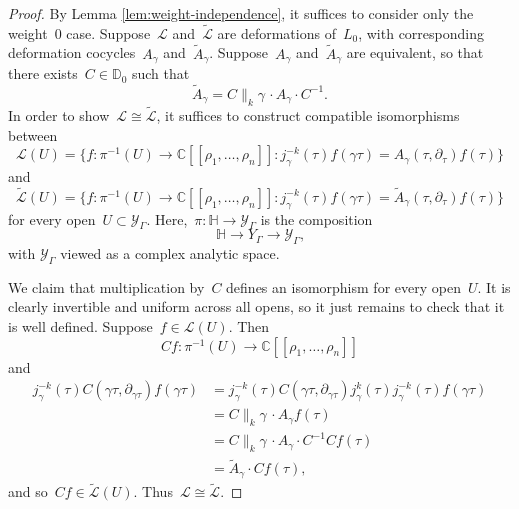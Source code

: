 \documentclass[10pt,a4paper]{article}
\numberwithin{equation}{section}
\theoremstyle{plain}
\theoremstyle{definition}
\newcommand{\tx}{\text}
\newcommand{\bbC}{\ensuremath{\mathbb{C}}}
\newcommand{\bbD}{\ensuremath{\mathbb{D}}}
\newcommand{\cL}{\ensuremath{\mathcal{L}}}
\newcommand{\cY}{\ensuremath{\mathcal{Y}}}
\let\wtd\widetilde
\newcommand{\defcol}{\mathrel{:}}
\newcommand{\condcol}{\mathrel{:}}
\newcommand{\llbrkt}{[\![}
\newcommand{\rrbrkt}{]\!]}
\newcommand{\HS}{\ensuremath{\mathbb{H}}}
\let\Ga\Gamma
\let\ga\gamma
\begin{document}
\begin{proof}
By Lemma \ref{lem:weight-independence}, it suffices to consider only the weight~$0$ case. Suppose~$\cL$ and~$\wtd{\cL}$ are deformations of~$L_0$, with corresponding deformation cocycles~$A_\ga$ and~$\wtd{A}_\ga$. Suppose~$A_\ga$ and~$\wtd{A}_\ga$ are equivalent, so that there exists~$C\in\bbD_0$ such that\vspace*{-3pt}
\begin{equation*}\wtd{A}_\ga = C\big\|_k\ga\,\cdot A_\ga\cdot C^{-1}\tx{.}\end{equation*}
In order to show~$\cL\cong \wtd{\cL}$, it suffices to construct compatible isomorphisms between
\begin{equation*}
\cL(U)
=
\big\{
f \defcol \pi^{-1}(U) \to \bbC\llbrkt \rho_1,\ldots,\rho_n\rrbrkt
\condcol
j_\ga^{-k}(\tau)f(\ga\tau) = A_\ga(\tau,\partial_\tau)f(\tau)
\big\}
\end{equation*}
and\vspace*{-3pt}
\begin{equation*}
\wtd{\cL}(U)
=
\big\{
f \defcol \pi^{-1}(U) \to \bbC\llbrkt \rho_1,\ldots,\rho_n\rrbrkt
\condcol
j_\ga^{-k}(\tau)f(\ga\tau) = \wtd{A}_\ga(\tau,\partial_\tau)f(\tau)
\big\}
\end{equation*}
for every open~$U\subset \cY_\Ga$. Here,~$\pi:\HS\to\cY_\Ga$ is the composition
\[
\HS\to Y_\Ga \to \cY_\Ga\tx{,}\]
with $\cY_\Ga$ viewed as a complex analytic space.

We claim that multiplication by~$C$ defines an isomorphism for every open~$U$. It is clearly invertible and uniform across all opens, so it just remains to check that it is well defined. Suppose~$f\in\cL(U)$. Then\vspace*{-3pt}
\begin{equation*} Cf:\pi^{-1}(U)\to\bbC\llbrkt \rho_1,\ldots,\rho_n\rrbrkt\end{equation*}
and\vspace*{-3pt}
\begin{align*}
j_\ga^{-k}(\tau)C(\ga\tau,\partial_{\ga\tau}) f(\ga\tau) &= j_{\ga}^{-k}(\tau)C(\ga\tau,\partial_{\ga\tau})j_\ga^{k}(\tau) j_\ga^{-k}(\tau) f(\ga\tau)\\
&= C\big\|_k\ga\, \cdot A_\ga f(\tau)\\
&= C\big\|_k\ga\, \cdot A_\ga \cdot C^{-1} Cf(\tau)\\
&= \wtd{A}_\ga \cdot Cf(\tau)\tx{,}
\end{align*}
and so~$Cf\in \wtd{\cL}(U)$. Thus~$\cL \cong \wtd{\cL}$.
\end{proof}
\end{document}
